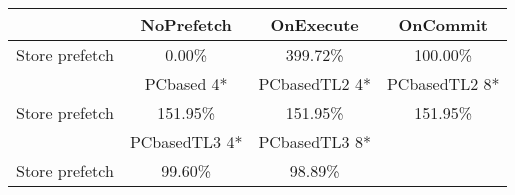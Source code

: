 \begin{tabular}{ l|ccc }
 & NoPrefetch & OnExecute & OnCommit\\ \hline
Store prefetch & 0.00\% & 399.72\% & 100.00\%\\ \hline
\hline
 & PCbased 4* & PCbasedTL2 4* & PCbasedTL2 8*\\ \hline
Store prefetch & 151.95\% & 151.95\% & 151.95\%\\ \hline
\hline
 & PCbasedTL3 4* & PCbasedTL3 8*&\\ \hline
Store prefetch & 99.60\% & 98.89\%&\\ \hline
\end{tabular}


